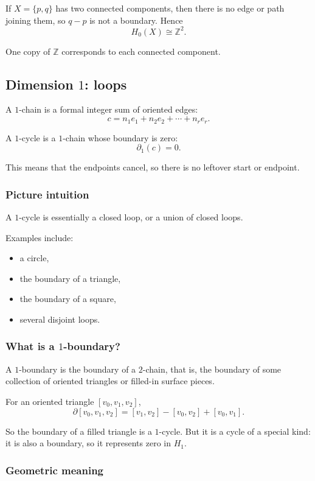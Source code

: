 \documentclass[12pt,a4paper]{article}
\newcommand{\Z}{\mathbb{Z}}
\theoremstyle{notespace}
\begin{document}
If \(X=\{p,q\}\) has two connected components, then there is no edge or path joining them, so \(q-p\) is not a boundary. Hence
\[
H_0(X)\cong \Z^2.
\]

One copy of \(\Z\) corresponds to each connected component.

\subsection{Dimension \(1\): loops}

A \(1\)-chain is a formal integer sum of oriented edges:
\[
c=n_1e_1+n_2e_2+\cdots+n_re_r.
\]

A \(1\)-cycle is a \(1\)-chain whose boundary is zero:
\[
\partial_1(c)=0.
\]

This means that the endpoints cancel, so there is no leftover start or endpoint.

\subsubsection*{Picture intuition}

A \(1\)-cycle is essentially a closed loop, or a union of closed loops.

Examples include:
\begin{itemize}
	\item a circle,
	\item the boundary of a triangle,
	\item the boundary of a square,
	\item several disjoint loops.
\end{itemize}

\subsubsection*{What is a \(1\)-boundary?}

A \(1\)-boundary is the boundary of a \(2\)-chain, that is, the boundary of some collection of oriented triangles or filled-in surface pieces.

For an oriented triangle \([v_0,v_1,v_2]\),
\[
\partial[v_0,v_1,v_2]
=
[v_1,v_2]-[v_0,v_2]+[v_0,v_1].
\]

So the boundary of a filled triangle is a \(1\)-cycle. But it is a cycle of a special kind: it is also a boundary, so it represents zero in \(H_1\).

\subsubsection*{Geometric meaning}
\end{document}
